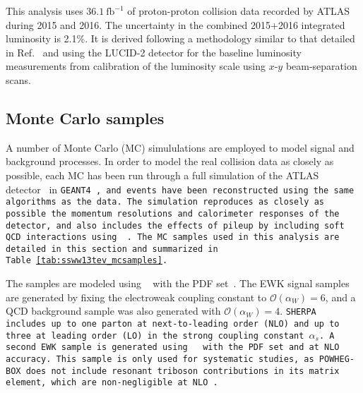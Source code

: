 This analysis uses $36.1~\textrm{fb}^{-1}$ of  proton-proton collision data recorded by ATLAS during 2015 and 2016.
The uncertainty in the combined 2015+2016 integrated luminosity is 2.1\%. It is derived following a methodology similar to that detailed in Ref.~\cite{2016.atlas-luminosity-8tev} and using the LUCID-2 detector for the baseline luminosity measurements \cite{2018.atlas-luminosity-lucid2} from calibration of the luminosity scale using $x$-$y$ beam-separation scans. %

\subsection{Monte Carlo samples}\label{ssww13tev:mc}
A number of Monte Carlo (MC) simululations are employed to model signal and background processes.
In order to model the real collision data as closely as possible, each MC has been run through a full simulation of the ATLAS detector~\cite{2010.ATLAS-simulation-infrastructure} in \tt{GEANT4}~\cite{2003.GEANT4}, and events have been reconstructed using the same algorithms as the data.
The simulation reproduces as closely as possible the momentum resolutions and calorimeter responses of the detector, and also includes the effects of pileup by including soft QCD interactions using ~\cite{2008.Pythia8}.
The MC samples used in this analysis are detailed in this section and summarized in Table~\ref{tab:ssww13tev_mcsamples}.

The \ssww samples are modeled using ~\cite{2009.Sherpa, 2008.CS_Shower, 2009.METS} with the \nnpdf PDF set~\cite{2015.NNPDF3}.
The EWK signal samples are generated by fixing the electroweak coupling constant to $\mathcal{O}(\alpha_W) = 6$, and a QCD background sample was also generated with $\mathcal{O}(\alpha_W) = 4$.
\tt{SHERPA} includes up to one parton at next-to-leading order (NLO) and up to three at leading order (LO) in the strong coupling constant $\alpha_s$.
A second \ssww EWK sample is generated using ~\cite{2010.powhegbox} with the \nnpdf PDF set and at NLO accuracy.
This sample is only used for systematic studies, as \tt{POWHEG-BOX} does not include resonant triboson contributions in its matrix element, which are non-negligible at NLO~\cite{2018.ssww-scattering-at-lhc}.

